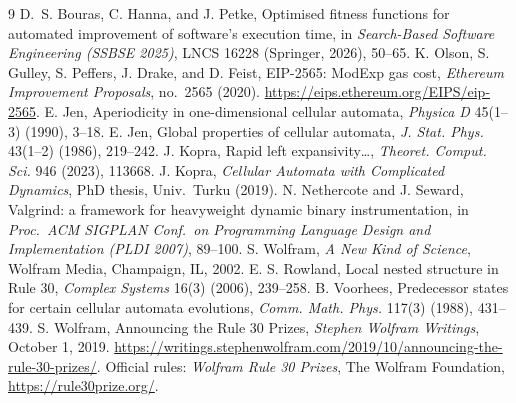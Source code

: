 \documentclass[11pt]{article}
\theoremstyle{definition}
\begin{document}
\begin{thebibliography}{9}\footnotesize
{} D.~S. Bouras, C. Hanna, and J. Petke, Optimised
fitness functions for automated improvement of software's execution time, in
\emph{Search-Based Software Engineering (SSBSE 2025)}, LNCS 16228 (Springer,
2026), 50--65.
 K. Olson, S. Gulley, S. Peffers, J. Drake, and D. Feist,
EIP-2565: ModExp gas cost, \emph{Ethereum Improvement Proposals}, no.\ 2565
(2020). \url{https://eips.ethereum.org/EIPS/eip-2565}.
 E. Jen, Aperiodicity in one-dimensional cellular automata,
\emph{Physica D} 45(1--3) (1990), 3--18.
 E. Jen, Global properties of cellular automata,
\emph{J. Stat. Phys.} 43(1--2) (1986), 219--242.
 J. Kopra, Rapid left expansivity\ldots, \emph{Theoret. Comput.
Sci.} 946 (2023), 113668.
 J. Kopra, \emph{Cellular Automata with Complicated
Dynamics}, PhD thesis, Univ.\ Turku (2019).
 N. Nethercote and J. Seward, Valgrind: a
framework for heavyweight dynamic binary instrumentation, in \emph{Proc.\ ACM
SIGPLAN Conf.\ on Programming Language Design and Implementation (PLDI 2007)},
89--100.
 S. Wolfram, \emph{A New Kind of Science}, Wolfram Media,
Champaign, IL, 2002.
 E. S. Rowland, Local nested structure in Rule 30,
\emph{Complex Systems} 16(3) (2006), 239--258.
 B. Voorhees, Predecessor states for certain cellular automata
evolutions, \emph{Comm. Math. Phys.} 117(3) (1988), 431--439.
 S. Wolfram, Announcing the Rule 30 Prizes,
\emph{Stephen Wolfram Writings}, October 1, 2019.
\url{https://writings.stephenwolfram.com/2019/10/announcing-the-rule-30-prizes/}.
Official rules: \emph{Wolfram Rule 30 Prizes}, The Wolfram Foundation,
\url{https://rule30prize.org/}.
\end{thebibliography}
\end{document}
